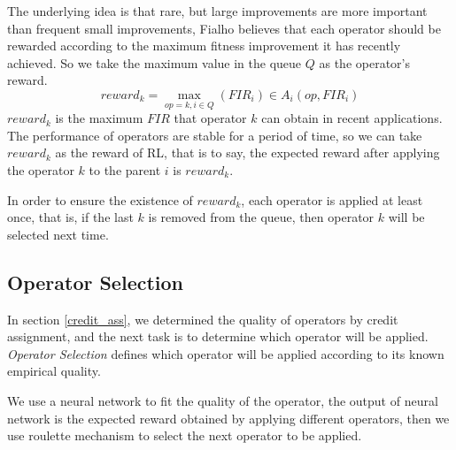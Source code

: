 \documentclass[journal]{IEEEtran}
\begin{document}
The underlying idea is that rare, but large improvements are more important than frequent small improvements, Fialho \cite{fialho2010comparison} believes that each operator should be rewarded according to the maximum fitness improvement it has recently achieved.
So we take the maximum value in the queue $Q$ as the operator's reward.
\begin{equation}
  reward_k = \max_{op=k, i\in Q}(FIR_i) \in A_i(op,FIR_i)
\end{equation}
$reward_k$ is the maximum $FIR$ that operator $k$ can obtain in recent applications.
The performance of operators are stable for a period of time, so we can take $reward_k$ as the reward of RL, that is to say, the expected reward after applying the operator $k$ to the parent $i$ is $reward_k$.

In order to ensure the existence of $reward_k$, each operator is applied at least once, that is, if the last $k$ is removed from the queue, then operator $k$ will be selected next time.

\subsection{Operator Selection}
In section \ref{credit_ass}, we determined the quality of operators by credit assignment, and the next task is to determine which operator will be applied. \textit{Operator Selection} defines which operator will be applied according to its known empirical quality.

We use a neural network to fit the quality of the operator, the output of neural network is the expected reward obtained by applying different operators, then we use roulette mechanism to select the next operator to be applied.
\end{document}
